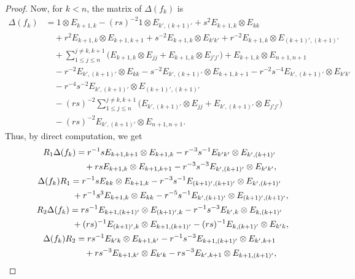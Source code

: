 \documentclass[pdftex]{sigma}
\numberwithin{equation}{section}
\begin{document}
\begin{proof}
Now, for $k < n$, the matrix of $\Delta(f_{k})$ is
\begin{align*}
 \Delta(f_{k}) &{}= 1 \otimes E_{k + 1,k} - (rs)^{-2}1 \otimes E_{k',(k + 1)'} + s^{2}E_{k + 1,k} \otimes E_{kk} \\
 &\quad{} + r^{2}E_{k + 1,k} \otimes E_{k + 1,k + 1} + s^{-2}E_{k + 1,k} \otimes E_{k'k'} + r^{-2}E_{k + 1,k} \otimes E_{(k + 1)',(k+ 1)'} \\
 &\quad{} + \sum_{1\leq j\leq n}^{j\ne k,k + 1} \bigl(E_{k + 1,k} \otimes E_{jj} + E_{k + 1,k} \otimes E_{j'j'}\bigr) + E_{k + 1,k} \otimes E_{n + 1,n + 1} \\
 &\quad{} - r^{-2}E_{k',(k + 1)'} \otimes E_{kk} - s^{-2}E_{k',(k + 1)'} \otimes E_{k + 1,k + 1} - r^{-2}s^{-4}E_{k',(k + 1)'} \otimes E_{k'k'} \\
 &\quad{} - r^{-4}s^{-2}E_{k',(k + 1)'} \otimes E_{(k + 1)',(k + 1)'} \\
 &\quad{} -(rs)^{-2}\sum_{1\leq j\leq n}^{j\ne k,k + 1} \bigl(E_{k',(k + 1)'} \otimes E_{jj} + E_{k',(k + 1)'} \otimes E_{j'j'}\bigr) \\
 &\quad{} - (rs)^{-2}E_{k',(k + 1)'} \otimes E_{n + 1,n+1}.
\end{align*}
Thus, by direct computation, we get
\begin{gather*}
 R_{1}\Delta(f_{k}) = r^{-1}sE_{k + 1,k + 1} \otimes E_{k + 1,k} - r^{-3}s^{-1}E_{k'k'} \otimes E_{k',(k + 1)'} \\[0.2mm]
 \hphantom{R_{1}\Delta(f_{k}) =}{}
 + rsE_{k+1,k} \otimes E_{k+1,k + 1} - r^{-3}s^{-3}E_{k',(k + 1)'} \otimes E_{k'k'},
 \\[0.2mm]
 \Delta(f_{k})R_{1} = r^{-1}sE_{kk} \otimes E_{k + 1,k} - r^{-3}s^{-1}E_{(k + 1)',(k + 1)'} \otimes E_{k',(k + 1)'} \\[0.2mm]
 \hphantom{\Delta(f_{k})R_{1} =}{}
 + r^{-1}s^{3}E_{k + 1,k} \otimes E_{kk} - r^{-5}s^{-1}E_{k',(k + 1)'} \otimes E_{(k + 1)',(k + 1)'},
\\[0.2mm]
 R_{2}\Delta(f_{k}) = rs^{-1}E_{k + 1,(k + 1)'} \otimes E_{(k + 1)',k} - r^{-1}s^{-3}E_{k',k} \otimes E_{k,(k + 1)'} \\[0.2mm]
 \hphantom{R_{2}\Delta(f_{k}) =}{}
 + (rs)^{-1}E_{(k + 1)',k} \otimes E_{k + 1,(k + 1)'} - (rs)^{-1}E_{k,(k + 1)'} \otimes E_{k'k},
 \\[0.2mm]
 \Delta(f_{k})R_{2} = rs^{-1}E_{k'k} \otimes E_{k + 1,k'} - r^{-1}s^{-3}E_{k + 1,(k + 1)'} \otimes E_{k',k + 1} \\[0.2mm]
 \hphantom{\Delta(f_{k})R_{2}=}{} + rs^{-3}E_{k + 1,k'} \otimes E_{k'k} - rs^{-3}E_{k',k + 1} \otimes E_{k + 1,(k + 1)'},

\end{gather*}
\end{proof}
\end{document}
